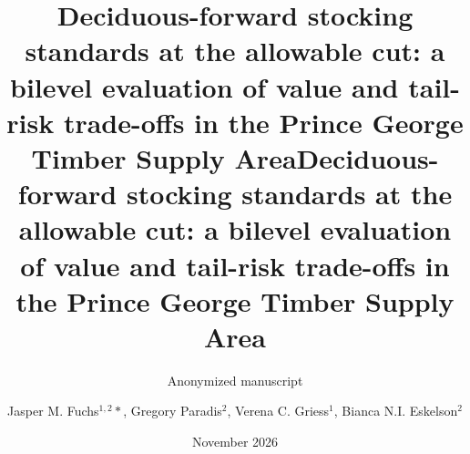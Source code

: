 \documentclass{article}
\title{Deciduous-forward stocking standards at the allowable cut: a bilevel evaluation of value and tail-risk trade-offs in the Prince George Timber Supply Area}
\author{Anonymized manuscript}
\date{\vspace{1cm}November 2026}
\title{Deciduous-forward stocking standards at the allowable cut: a bilevel evaluation of value and tail-risk trade-offs in the Prince George Timber Supply Area}
\author{Jasper M. Fuchs$^{1,2}*$, Gregory Paradis$^2$, Verena C. Griess$^1$, Bianca N.I. Eskelson$^2$}
\date{\vspace{1cm}\raggedright
    $^1$Department of Environmental Systems Science, Institute of Terrestrial Ecosystems, ETH Zurich, Switzerland\\
    $^2$Department of Forest Resources Management, The University of British Columbia, Canada\\
    $*$\textit{corresponding author: jasper.fuchs@usys.ethz.ch}\\
    \vspace{1cm}November 2026}
\newif\ifreview
\begin{document}
\renewcommand{\figurename}{Fig.}

\maketitle

\newpage







\ifreview

\else



\fi




\end{document}
